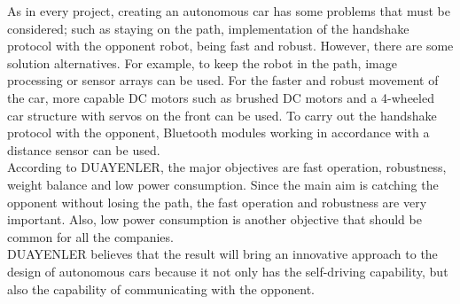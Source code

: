 \documentclass[a4paper,12pt]{article}
\begin{document}
As in every project, creating an autonomous car has some problems that must be considered; such as staying on the path, implementation of the handshake protocol with the opponent robot, being fast and robust. However, there are some solution alternatives. For example, to keep the robot in the path, image processing or sensor arrays can be used. For the faster and robust movement of the car, more capable DC motors such as brushed DC motors and a 4-wheeled car structure with servos on the front can be used. To carry out the handshake protocol with the opponent, Bluetooth modules working in accordance with a distance sensor can be used.\\

According to DUAYENLER, the major objectives are fast operation, robustness, weight balance and low power consumption. Since the main aim is catching the opponent without losing the path, the fast operation and robustness are very important. Also, low power consumption is another objective that should be common for all the companies.\\

DUAYENLER believes that the result will bring an innovative approach to the design of autonomous cars because it not only has the self-driving capability, but also the capability of communicating with the opponent.

\newpage
\begin{appendices}
	
		
		

	
\end{appendices}
\end{document}
